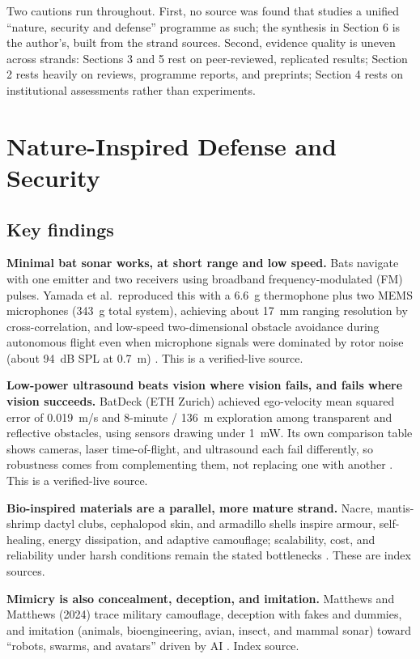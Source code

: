 \documentclass[11pt]{article}
\begin{document}
Two cautions run throughout. First, no source was found that studies a
unified ``nature, security and defense'' programme as such; the
synthesis in Section 6 is the author's, built from the strand sources.
Second, evidence quality is uneven across strands: Sections 3 and 5
rest on peer-reviewed, replicated results; Section 2 rests heavily on
reviews, programme reports, and preprints; Section 4 rests on
institutional assessments rather than experiments.

\section{Nature-Inspired Defense and Security}
\label{sec:biomimicry}

\subsection{Key findings}

\textbf{Minimal bat sonar works, at short range and low speed.}
Bats navigate with one emitter and two receivers using broadband
frequency-modulated (FM) pulses. Yamada et al.\ reproduced this with a
6.6~g thermophone plus two MEMS microphones (343~g total system),
achieving about 17~mm ranging resolution by cross-correlation, and
low-speed two-dimensional obstacle avoidance during autonomous flight
even when microphone signals were dominated by rotor noise
(about 94~dB SPL at 0.7~m) \cite{yamada2026}. This is a verified-live
source.

\textbf{Low-power ultrasound beats vision where vision fails, and
fails where vision succeeds.} BatDeck (ETH Zurich) achieved
ego-velocity mean squared error of 0.019~m/s and 8-minute / 136~m
exploration among transparent and reflective obstacles, using sensors
drawing under 1~mW. Its own comparison table shows cameras, laser
time-of-flight, and ultrasound each fail differently, so robustness
comes from complementing them, not replacing one with another
\cite{batdeck2024}. This is a verified-live source.

\textbf{Bio-inspired materials are a parallel, more mature strand.}
Nacre, mantis-shrimp dactyl clubs, cephalopod skin, and armadillo
shells inspire armour, self-healing, energy dissipation, and adaptive
camouflage; scalability, cost, and reliability under harsh conditions
remain the stated bottlenecks \cite{igi2025,armadillo2024}. These are
index sources.

\textbf{Mimicry is also concealment, deception, and imitation.}
Matthews and Matthews (2024) trace military camouflage, deception with
fakes and dummies, and imitation (animals, bioengineering, avian,
insect, and mammal sonar) toward ``robots, swarms, and avatars'' driven
by AI \cite{matthews2024}. Index source.
\end{document}
